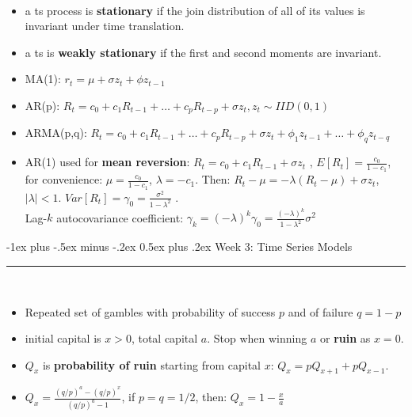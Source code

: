 \documentclass[10pt,landscape,a4paper]{article}
\makeatletter
\renewcommand{\section}{\@startsection{section}{1}{0mm}%
                                {-1ex plus -.5ex minus -.2ex}%
                                {0.5ex plus .2ex}%
                                {\normalfont\large\bfseries}}
\makeatother
\begin{document}
\begin{multicols*}{3}
\begin{description}[topsep=0pt]
	\item[Time series models] ~
	\begin{itemize}[topsep=0pt]
		\item a ts process is \textbf{stationary} if the join distribution of all of its values is invariant under time translation.
		\item a ts is \textbf{weakly stationary} if the first and second moments are invariant.
		\item MA(1): $r_t = \mu + \sigma z_t + \phi z_{t-1}$ 
		\item AR(p): $R_t = c_0+c_1 R_{t-1} + \dots + c_p R_{t-p} + \sigma z_t, z_t \sim IID(0,1) $
		\item ARMA(p,q): 
		$R_t = c_0 + c_1 R_{t-1} + \dots + c_p R_{t-p} + \sigma z_t + \phi_1 z_{t-1} + \dots + \phi_q z_{t-q}$
		\item AR(1) used for \textbf{mean reversion}:  $R_t = c_0 + c_1 R_{t-1} + \sigma z_t$ , $E[R_t]=\frac{c_0}{1-c_1}$, for convenience: $\mu = \frac{c_0}{1-c_1}$, $\lambda = -c_1$. Then: $R_t-\mu = -\lambda (R_t-\mu) + \sigma z_t $, $|\lambda | <1$. 
		$Var[R_t] = \gamma_0 = \frac{\sigma^2}{1-\lambda^2}$ . \\
		Lag-$k$ autocovariance coefficient: $\gamma_k=(-\lambda)^k \gamma_0 = \frac{(-\lambda)^k}{1-\lambda^2} \sigma^2$
	\end{itemize}
\end{description}

\section{Week 3: Time Series Models}\smallskip \hrule height 1pt \smallskip


\begin{description}[topsep=0pt]
	\item[Gambler's Ruin] ~
	\begin{itemize}[topsep=0pt]
		\item Repeated set of gambles with probability of success $p$ and of failure $q=1-p$
		\item initial capital is $x>0$, total capital $a$. Stop when winning $a$ or \textbf{ruin} as $x=0$.
		\item $Q_x$ is \textbf{probability of ruin} starting from capital $x$: $Q_x=pQ_{x+1} + p Q_{x-1}$.
		\item $Q_x = \frac{(q/p)^a-(q/p)^x}{(q/p)^a-1}$, if $p=q=1/2$, then:  $Q_x=1-\frac{x}{a}$
		

\end{itemize}
\end{description}
\end{multicols*}
\end{document}
